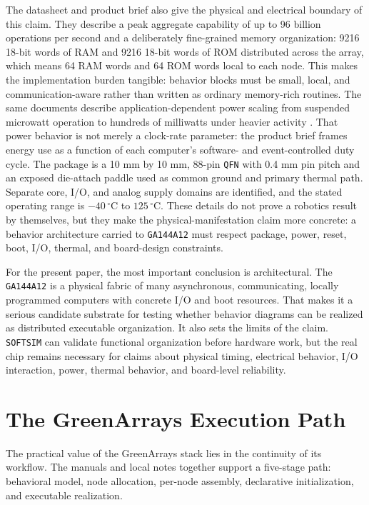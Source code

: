\documentclass[11pt]{article}
\begin{document}
The datasheet and product brief also give the physical and electrical
boundary of this claim. They describe a peak aggregate capability of up to
96 billion operations per second and a deliberately fine-grained memory
organization: 9216 18-bit words of RAM and 9216 18-bit words of ROM
distributed across the array, which means 64 RAM words and 64 ROM words
local to each node. This makes the implementation burden tangible:
behavior blocks must be small, local, and communication-aware rather than
written as ordinary memory-rich routines. The same documents describe
application-dependent power scaling from suspended microwatt operation to
hundreds of milliwatts under heavier activity
\citep{greenarrays2026ga144a12,cartheur2026pb001}. That
power behavior is not merely a clock-rate parameter: the product brief
frames energy use as a function of each computer's software- and
event-controlled duty cycle. The package is a 10 mm by 10 mm, 88-pin
\texttt{QFN} with 0.4 mm pin pitch and an exposed die-attach paddle used as
common ground and primary thermal path. Separate core, I/O, and analog
supply domains are identified, and the stated operating range is
\(-40\,^\circ\mathrm{C}\) to \(125\,^\circ\mathrm{C}\). These details do
not prove a robotics result by themselves, but they make the
physical-manifestation claim more concrete: a behavior architecture carried
to \texttt{GA144A12} must respect package, power, reset, boot, I/O, thermal,
and board-design constraints.

For the present paper, the most important conclusion is architectural. The
\texttt{GA144A12} is a physical fabric of many asynchronous, communicating,
locally programmed computers with concrete I/O and boot resources. That
makes it a serious candidate substrate for testing whether behavior
diagrams can be realized as distributed executable organization. It also
sets the limits of the claim. \texttt{SOFTSIM} can validate functional
organization before hardware work, but the real chip remains necessary for
claims about physical timing, electrical behavior, I/O interaction, power,
thermal behavior, and board-level reliability.

\section{The GreenArrays Execution Path}

The practical value of the GreenArrays stack lies in the continuity of its
workflow. The manuals and local notes together support a five-stage path:
behavioral model, node allocation, per-node assembly, declarative
initialization, and executable realization.
\end{document}

